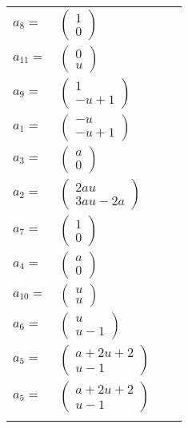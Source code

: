 \documentclass[1p]{elsarticle_modified}
\theoremstyle{definition}
\begin{document}
\begin{tabular}{m{7pt} m{180pt} m{7pt} m{180pt} }
\flushright $a_{8}=$&$\begin{pmatrix}1\\0\end{pmatrix}$ \\
\flushright $a_{11}=$&$\begin{pmatrix}0\\u\end{pmatrix}$ \\
\flushright $a_{9}=$&$\begin{pmatrix}1\\- u+1\end{pmatrix}$ \\
\flushright $a_{1}=$&$\begin{pmatrix}- u\\- u+1\end{pmatrix}$ \\
\flushright $a_{3}=$&$\begin{pmatrix}a\\0\end{pmatrix}$ \\
\flushright $a_{2}=$&$\begin{pmatrix}2 a u\\3 a u-2 a\end{pmatrix}$ \\
\flushright $a_{7}=$&$\begin{pmatrix}1\\0\end{pmatrix}$ \\
\flushright $a_{4}=$&$\begin{pmatrix}a\\0\end{pmatrix}$ \\
\flushright $a_{10}=$&$\begin{pmatrix}u\\u\end{pmatrix}$ \\
\flushright $a_{6}=$&$\begin{pmatrix}u\\u-1\end{pmatrix}$ \\
\flushright $a_{5}=$&$\begin{pmatrix}a+2 u+2\\u-1\end{pmatrix}$\\ \flushright $a_{5}=$&$\begin{pmatrix}a+2 u+2\\u-1\end{pmatrix}$\\&\end{tabular}
\end{document}
